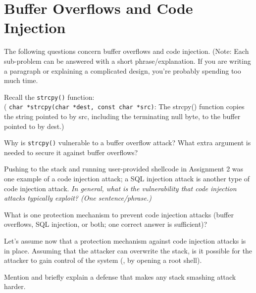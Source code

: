 \section{Buffer Overflows and Code Injection}

The following questions concern buffer overflows and code injection. 
(Note: Each sub-problem can be answered with a short phrase/explanation. If
you are writing a paragraph or explaining a complicated design, you're
probably spending too much time.

Recall the {\tt strcpy()} function: 
\\( {\tt char *strcpy(char *dest, const char *src)}: The strcpy() function copies
the string pointed to by src, including the terminating null byte, to the buffer pointed to by dest.)

Why is {\tt strcpy()} vulnerable to a buffer overflow attack? What extra
argument is needed to secure it against buffer overflows?

\eprob
\vspace*{0.5in}

Pushing to the stack and running user-provided shellcode in Assignment
2 was one example of a code injection attack; a SQL injection attack is another
type of code injection attack. 
{\em In general, what is the vulnerability that code injection attacks typically
exploit? (One sentence/phrase.)} 

\eprob
\vspace*{0.5in}

 What is one protection mechanism to prevent code injection attacks (buffer
overflows, SQL injection, or both; one correct answer is sufficient)?

\eprob
\vspace*{0.5in}

 Let's assume now that a protection mechanism against code injection
attacks is in place. Assuming that the attacker can overwrite the stack, is it
possible for the attacker to gain control of the system (\eg, by opening a root
shell).

\eprob

\item Mention and briefly explain a defense that makes any stack smashing attack
harder.

\eprob
\fi



